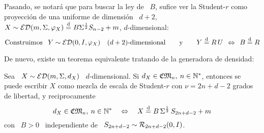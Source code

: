 Pasando, se notar\'a que para buscar la ley de \ $B$, sufice ver la Student-$r$
como  proyecci\'on  de una  uniforme  de  dimensi\'on \  $d+2$,  \ie  \ $X  \sim
\mathcal{ED}(m,\Sigma,\varphi_X) \stackrel{\mathrm{d}}{=} B \Sigma^{\frac12} S_{n-2} + m$, $d$-dimensional:
%
\[
\mbox{Construimos     }     \:\:     Y     \sim     \mathcal{ED}(0,I,\varphi_X)     \quad
(d+2)\mbox{-dimensional}  \qquad   \mbox{y}  \qquad  Y   \stackrel{\mathrm{d}}{=}  R  \,   U  \:\:
\Leftrightarrow \:\: B \stackrel{\mathrm{d}}{=} R
\]


De nuevo, existe un teorema equivalente tratando de la generadora de densidad:
%

%
\begin{teorema}
\label{Teo:MP:MezclaStudentRDensidad}
%
  Sea \  $X \sim \mathcal{ED}(m,\Sigma,d_X)$ \  $d$-dimensional. Si $d_X \in  \mathfrak{CM}_n, \: n
  \in  \mathbb{N}^*$,  entonces  se puede  escribir  $X$  como  mezcla de  escala  de
  Student-$r$ con $\nu = 2 n + d - 2$ grados de libertad, y reciprocamente
  \[
  d_X \in  \mathfrak{CM}_n, \:  n \in \mathbb{N}^*  \quad \Leftrightarrow  \quad X \stackrel{\mathrm{d}}{=}  B \,
  \Sigma^{\frac12} \, S_{2 n + d - 2} + m
  \]
  con \ $B > 0$ \ independiente de \ $S_{2 n + d - 2} \sim \mathcal{R}_{2 n + d - 2}(0,I)$.
\end{teorema}
%
